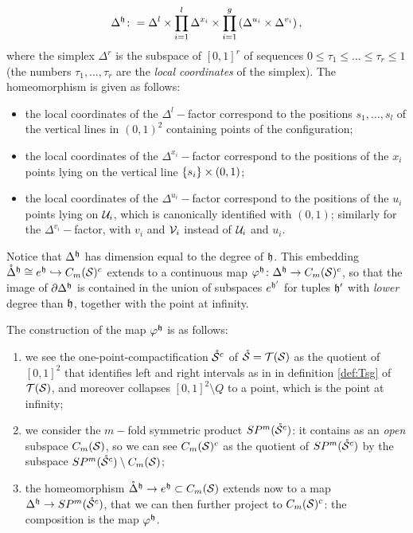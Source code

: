 \[
 \Delta^{\mathfrak{h}}\colon =
 \Delta^l\times\prod_{i=1}^l\Delta^{x_i}\times\prod_{i=1}^g\left(\Delta^{u_i}\times\Delta^{v_i}\right),
\]
where the simplex $\Delta^r$ is the subspace of $[0,1]^r$ of sequences $0\leq \tau_1\leq\dots\leq\tau_r\leq 1$
(the numbers $\tau_1,\dots,\tau_r$ are the \emph{local coordinates} of the simplex). The homeomorphism is given
as follows:
\begin{itemize}
 \item the local coordinates of the $\Delta^l-$factor correspond to the positions $s_1,\dots,s_l$ of the vertical
 lines in $(0,1)^2$ containing points of the configuration;
 \item the local coordinates of the $\Delta^{x_i}-$factor correspond to the positions of the $x_i$ points
 lying on the vertical line $\left\{s_i\right\}\times(0,1)$;
 \item the local coordinates of the $\Delta^{u_i}-$factor correspond to the positions of the $u_i$ points
 lying on $\mathcal{U}_i$, which is canonically identified with $(0,1)$; similarly for the $\Delta^{v_i}-$factor,
 with $v_i$ and $\mathcal{V}_i$ instead of $\mathcal{U}_i$ and $u_i$.
\end{itemize}
Notice that $\Delta^{\mathfrak{h}}$ has dimension equal to the degree of $\mathfrak{h}$.
This embedding $\mathring{\Delta}^{\mathfrak{h}}\cong e^{\mathfrak{h}}\hookrightarrow C_m(\mathcal{S})^c$ extends to a continuous map
$\varphi^{\mathfrak{h}}\colon\Delta^{\mathfrak{h}}\to C_m(\mathcal{S})^c$, so that the image of $\partial\Delta^{\mathfrak{h}}$ is contained in the union of
subspaces $e^{\mathfrak{h}'}$ for tuples $\mathfrak{h}'$ with \emph{lower} degree than $\mathfrak{h}$, together with the point
at infinity.

The construction of the map $\varphi^{\mathfrak{h}}$ is as follows:
\begin{enumerate}
\item we see the one-point-compactification
$\mathring{\mathcal{S}}^c$ of $\mathring{\mathcal{S}}=\mathcal{T}(\mathcal{S})$ as the quotient of $[0,1]^2$ that identifies left and right intervals as in
in definition \ref{def:Tsg} of $\mathcal{T}(\mathcal{S})$, and moreover collapses $[0,1]^2\setminus Q$ to a point, which
is the point at infinity;
\item we consider the $m-$fold symmetric product $SP^m(\mathring{\mathcal{S}}^c)$: it contains 
as an \emph{open} subspace $C_m(\mathcal{S})$, so we can see $C_m(\mathcal{S})^c$ as the quotient of $SP^m(\mathring{\mathcal{S}}^c)$ by
the subspace $SP^m(\mathring{\mathcal{S}}^c)\setminus C_m(\mathcal{S})$;
\item the homeomorphism $\mathring{\Delta}^{\mathfrak{h}}\to e^{\mathfrak{h}}\subset C_m(\mathcal{S})$ extends now to a map
$\Delta^{\mathfrak{h}}\to SP^m(\mathring{\mathcal{S}}^c)$, that we can then further project to $C_m(\mathcal{S})^c$: the composition
is the map $\varphi^{\mathfrak{h}}$.
\end{enumerate}

